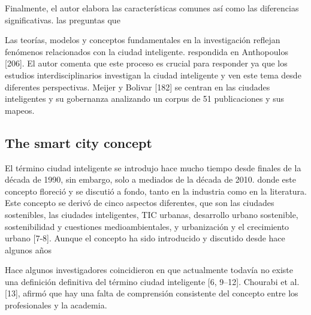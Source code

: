 \documentclass[a4paper,fleqn,spanish]{cas-dc}
\begin{document}
Finalmente, el autor elabora las características comunes así como las
diferencias significativas. las preguntas que

Las teorías, modelos y conceptos fundamentales en la investigación reflejan
fenómenos relacionados con la ciudad inteligente.  respondida en Anthopoulos
[206]. El autor comenta que este proceso es crucial para responder ya que los
estudios interdisciplinarios investigan la ciudad inteligente y ven este tema
desde diferentes perspectivas.  Meijer y Bolivar [182] se centran en las
ciudades inteligentes y su gobernanza analizando un corpus de 51 publicaciones
y sus mapeos.

\cite{stubinger_understanding_2020}

\subsection{The smart city concept}\label{concepto}


El término ciudad inteligente se introdujo hace mucho tiempo desde finales de
la década de 1990, sin embargo, solo a mediados de la década de 2010.
donde este concepto floreció y se discutió a fondo, tanto en la industria como en la
literatura. Este concepto se derivó de cinco aspectos diferentes, que
son las ciudades sostenibles, las ciudades inteligentes, TIC urbanas,
desarrollo urbano sostenible, sostenibilidad y cuestiones medioambientales, y
urbanización y el crecimiento urbano [7-8]. Aunque el concepto ha sido
introducido y discutido desde hace algunos años

Hace algunos investigadores coincidieron en que actualmente todavía no existe
una definición definitiva del término ciudad inteligente [6, 9–12]. Chourabi et
al. [13], afirmó que hay una falta de comprensión consistente del concepto
entre los profesionales y la academia.
\end{document}
